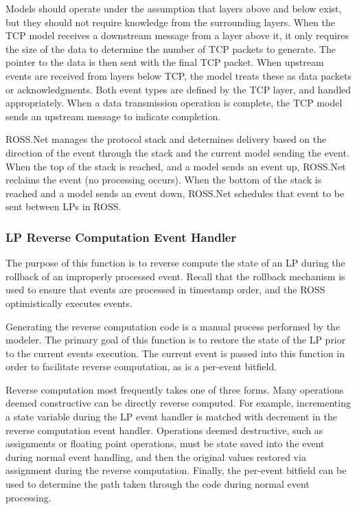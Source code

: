 \documentclass[12pt]{article}
\begin{document}
Models should operate under the assumption that layers above and below exist,
but they should not require knowledge from the surrounding layers.  When the
TCP model receives a downstream message from a layer above it, it only
requires the size of the data to determine the number of TCP packets to
generate.  The pointer to the data is then sent with the final TCP packet.
When upstream events are received from layers below TCP, the model treats
these as data packets or acknowledgments.  Both event types are defined by
the TCP layer, and handled appropriately.  When a data transmission operation
is complete, the TCP model sends an upstream message to indicate completion.

ROSS.Net manages the protocol stack and determines delivery based on the
direction of the event through the stack and the current model sending the
event.  When the top of the stack is reached, and a model sends an event up,
ROSS.Net reclaims the event (no processing occurs).  When the bottom of the
stack is reached and a model sends an event down, ROSS.Net schedules that
event to be sent between LPs in ROSS.

\subsubsection{LP Reverse Computation Event Handler}

The purpose of this function is to reverse compute the state of an LP during
the rollback of an improperly processed event.  Recall that the rollback
mechanism is used to ensure that events are processed in timestamp order, and
the ROSS optimistically executes events.

Generating the reverse computation code is a manual process performed by the
modeler.  The primary goal of this function is to restore the state of the LP
prior to the current events execution.  The current event is passed into this
function in order to facilitate reverse computation, as is a per-event
bitfield.

Reverse computation most frequently takes one of three forms.  Many operations
deemed constructive can be directly reverse computed.  For example,
incrementing a state variable during the LP event handler is matched with
decrement in the reverse computation event handler.  Operations deemed
destructive, such as assignments or floating point operations, must be state
saved into the event during normal event handling, and then the original
values restored via assignment during the reverse computation.  Finally, the
per-event bitfield can be used to determine the path taken through the code
during normal event processing.
\end{document}
